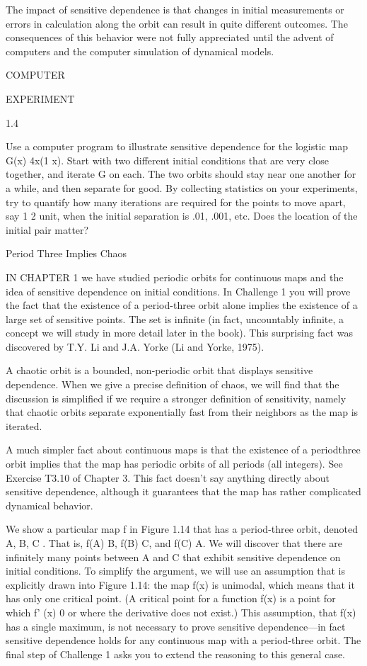 \documentclass[12pt]{article}
\begin{document}
The impact of sensitive dependence is that changes in initial measurements or errors in calculation along 
the orbit can result in quite different outcomes. The consequences of this behavior were not fully 
appreciated until the advent of computers and the computer simulation of dynamical models.



COMPUTER

EXPERIMENT

1.4

Use a computer program to illustrate sensitive dependence for the logistic map G(x)  4x(1  x). Start with 
two different initial conditions that are very close together, and iterate G on each. The two orbits should 
stay near one another for a while, and then separate for good. By collecting statistics on your 
experiments, try to quantify how many iterations are required for the points to move apart, say 1  2 unit, 
when the initial separation is .01, .001, etc. Does the location of the initial pair matter?

Period Three Implies Chaos

IN CHAPTER 1 we have studied periodic orbits for continuous maps and the idea of sensitive dependence on 
initial conditions. In Challenge 1 you will prove the fact that the existence of a period-three orbit alone 
implies the existence of a large set of sensitive points. The set is inﬁnite (in fact, uncountably 
inﬁnite, a concept we will study in more detail later in the book). This surprising fact was discovered by 
T.Y. Li and J.A. Yorke (Li and Yorke, 1975).

A chaotic orbit is a bounded, non-periodic orbit that displays sensitive dependence. When we give a precise 
deﬁnition of chaos, we will ﬁnd that the discussion is simpliﬁed if we require a stronger deﬁnition of 
sensitivity, namely that chaotic orbits separate exponentially fast from their neighbors as the map is 
iterated.

A much simpler fact about continuous maps is that the existence of a periodthree orbit implies that the map 
has periodic orbits of all periods (all integers). See Exercise T3.10 of Chapter 3. This fact doesn’t say 
anything directly about sensitive dependence, although it guarantees that the map has rather complicated 
dynamical behavior.

We show a particular map f in Figure 1.14 that has a period-three orbit, denoted A, B, C  . That is, f(A)  
B, f(B)  C, and f(C)  A. We will discover that there are inﬁnitely many points between A and C that 
exhibit sensitive dependence on initial conditions. To simplify the argument, we will use an assumption 
that is explicitly drawn into Figure 1.14: the map f(x) is unimodal, which means that it has only one 
critical point. (A critical point for a function f(x) is a point for which f' (x)  0 or where the 
derivative does not exist.) This assumption, that f(x) has a single maximum, is not necessary to prove 
sensitive dependence—in fact sensitive dependence holds for any continuous map with a period-three orbit. 
The ﬁnal step of Challenge 1 asks you to extend the reasoning to this general case.
\end{document}
